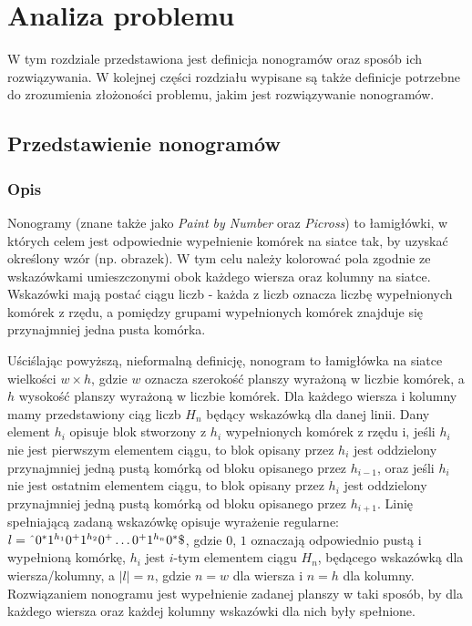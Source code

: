 \chapter{Analiza problemu}
\thispagestyle{chapterBeginStyle}
\label{rozdzial1}

    W tym rozdziale przedstawiona jest definicja nonogramów oraz sposób ich rozwiązywania.
W kolejnej części rozdziału wypisane są także definicje potrzebne do zrozumienia złożoności problemu,
jakim jest rozwiązywanie nonogramów.



\section{Przedstawienie nonogramów}


\subsection{Opis}
    Nonogramy (znane także jako \textit{Paint by Number} oraz \textit{Picross}) to łamigłówki, w których
celem jest odpowiednie wypełnienie komórek na siatce tak, by uzyskać określony wzór (np. obrazek).
W tym celu należy kolorować pola zgodnie ze wskazówkami umieszczonymi obok każdego wiersza oraz kolumny
na siatce. Wskazówki mają postać ciągu liczb - każda z liczb oznacza liczbę wypełnionych komórek z rzędu,
a pomiędzy grupami wypełnionych komórek znajduje się przynajmniej jedna pusta komórka.

    Uściślając powyższą, nieformalną definicję, nonogram to łamigłówka na siatce wielkości $w \times h$,
gdzie $w$ oznacza szerokość planszy wyrażoną w liczbie komórek, a $h$ wysokość planszy wyrażoną w
liczbie komórek. Dla każdego wiersza i kolumny mamy przedstawiony ciąg liczb $H_n$ będący wskazówką
dla danej linii. Dany element $h_i$ opisuje blok stworzony z $h_i$ wypełnionych komórek z rzędu i, jeśli
$h_i$ nie jest pierwszym elementem ciągu, to blok opisany przez $h_i$ jest oddzielony 
przynajmniej jedną pustą komórką od bloku opisanego przez $h_{i-1}$, 
oraz jeśli $h_i$ nie jest ostatnim elementem ciągu, to blok opisany przez $h_i$ jest oddzielony
przynajmniej jedną pustą komórką od bloku opisanego przez $h_{i+1}$. Linię spełniającą zadaną wskazówkę
opisuje wyrażenie regularne: $l=\text{\^{}}0^*1^{h_1}0^+1^{h_2}0^+\ldots0^+1^{h_n}0^*\text{\$}$, gdzie 
$0$, $1$ oznaczają odpowiednio pustą i wypełnioną komórkę, $h_i$ jest $i$-tym elementem ciągu $H_n$,
będącego wskazówką dla wiersza/kolumny, a $|l| = n$, gdzie $n = w$ dla wiersza i $n = h$ dla kolumny. 
Rozwiązaniem nonogramu jest wypełnienie zadanej planszy w taki sposób, 
by dla każdego wiersza oraz każdej kolumny wskazówki dla nich były spełnione.

